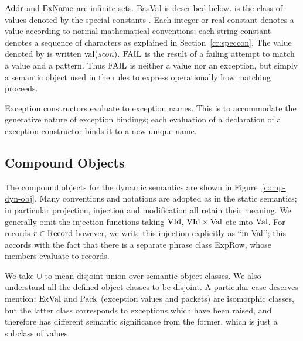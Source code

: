 ${\rm Addr}$ and ${\rm ExName}$ are infinite sets. BasVal is described below.
{\SVal} is the class of values denoted by the special constants
\SCon. Each integer or real constant denotes a value according to normal 
mathematical conventions; each string 
constant denotes a sequence of characters as explained in Section~\ref{cr:speccon}. The value denoted
by {\scon} is written $\mathop{\rm val}\nolimits({\it scon})$.
${\rm FAIL}$ is the result of a failing attempt to match a value and a
pattern. Thus ${\rm FAIL}$ is neither a value nor an exception, but simply
a semantic object used in the rules to express operationally
how matching proceeds.

Exception constructors evaluate to exception names.
This is to accommodate the generative
nature of exception bindings; each evaluation of a declaration of a
exception constructor binds it to a new unique name.

\subsection{Compound Objects}

The compound objects for the dynamic semantics are
shown in Figure~\ref{comp-dyn-obj}.
Many conventions and notations are adopted as in the static semantics; in
particular projection, injection and modification all retain
their meaning.
We generally omit the injection functions taking ${\rm VId}$,
${\rm VId}\times{\rm Val}$ etc into ${\rm Val}$.
For records $r\in{\rm Record}$ however,
we write this injection explicitly as ``$\mbox{\rm in}\ {\rm Val}$''; this accords with
the fact that there is a separate phrase class ExpRow, whose members
evaluate to records. 

We take $\cup$ to mean disjoint union over
semantic object classes. We also understand all the defined object
classes to be disjoint. A particular case deserves mention; ${\rm ExVal}$
and ${\rm Pack}$ (exception values and packets) are isomorphic classes,
but the latter class corresponds to exceptions which have been
raised, and therefore has different semantic significance from the
former, which is just a subclass of values.


